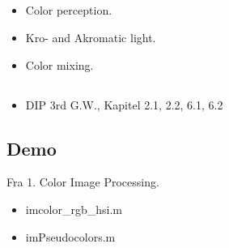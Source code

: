 \subsection{\subtopics}

\begin{itemize}
	\item Color perception.
	\item Kro- and Akromatic light.
	\item Color mixing.
\end{itemize}

\subsection{\curriculum}

\begin{itemize}
	\item DIP 3rd G.W., Kapitel 2.1, 2.2, 6.1, 6.2
\end{itemize}

\subsection{Demo}

Fra 1. Color Image Processing.

\begin{itemize}
	\item imcolor\_rgb\_hsi.m
	\item imPseudocolors.m
\end{itemize}
